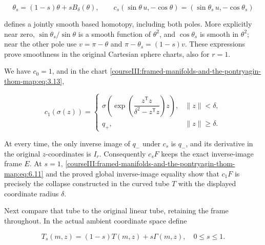\begin{equation}
\theta_s=(1-s)\theta+sB_\delta(\theta),\qquad
 c_s(\sin\theta\,u,-\cos\theta)
                =(\sin\theta_s\,u,-\cos\theta_s)
 \label{courseIII:framed-manifolds-and-the-pontryagin-thom-map:eq:6.10}
\end{equation}

defines a jointly smooth based homotopy, including both poles. More explicitly near zero, \(\sin\theta_s/\sin\theta\) is a smooth function of \(\theta^2\), and \(\cos\theta_s\) is smooth in \(\theta^2\); near the other pole use \(v=\pi-\theta\) and
\(\pi-\theta_s=(1-s)v\). These expressions prove smoothness in the original Cartesian sphere charts, also for \(r=1\).

We have \(c_0=1\), and in the chart \eqref{courseIII:framed-manifolds-and-the-pontryagin-thom-map:eq:3.13},

\begin{equation}
c_1(\sigma(z))=
 \begin{cases}
 \sigma\!\left(\exp\!\left(\dfrac{z^{\mathsf T}z}
                                  {\delta^2-z^{\mathsf T}z}\right)z\right),
                                           &\|z\|<\delta,\\
 q_+,                                      &\|z\|\geq\delta.
 \end{cases}
 \label{courseIII:framed-manifolds-and-the-pontryagin-thom-map:eq:6.11}
\end{equation}

At every time, the only inverse image of \(q_-\) under \(c_s\) is \(q_-\), and its derivative in the original \(z\)-coordinates is \(I_r\). Consequently \(c_sF\) keeps the exact inverse-image frame \(E\). At \(s=1\), \eqref{courseIII:framed-manifolds-and-the-pontryagin-thom-map:eq:6.11} and the proved global inverse-image equality show that \(c_1F\) is precisely the collapse constructed in the curved tube \(T\) with the displayed coordinate radius \(\delta\).

Next compare that tube to the original linear tube, retaining the frame throughout. In the actual ambient coordinate space define

\begin{equation}
T_s(m,z)=(1-s)T(m,z)+s\Gamma(m,z),\quad 0\leq s\leq1.
 \label{courseIII:framed-manifolds-and-the-pontryagin-thom-map:eq:6.12}
\end{equation}

